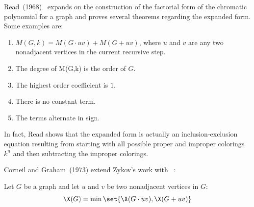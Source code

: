 Read~(1968)~\cite{read} expands on the construction of the factorial form of the chromatic polynomial for a graph
and proves several theorems regarding the expanded form.  Some examples are:
\begin{enumerate}
\item \(M(G,k)=M(G\cdot uv)+M(G+uv)\), where \(u\) and \(v\) are any two nonadjacent vertices in the current
  recursive step.
\item The degree of M(G,k) is the order of \(G\).
\item The highest order coefficient is \(1\).
\item There is no constant term.
\item The terms alternate in sign.
\end{enumerate}
In fact, Read shows that the expanded form is actually an inclusion-exclusion equation resulting from starting with
all possible proper and improper colorings \(k^n\) and then subtracting the improper colorings.

Corneil and Graham~(1973) extend Zykov's work with \theoremname~\cite{corneil}:

\begin{theorem}
  \label{thm:corneil}
  Let \(G\) be a graph and let \(u\) and \(v\) be two nonadjacent vertices in \(G\):
  \[\X(G)=\min\set{\X(G\cdot uv),\X(G+uv)}\]
\end{theorem}

